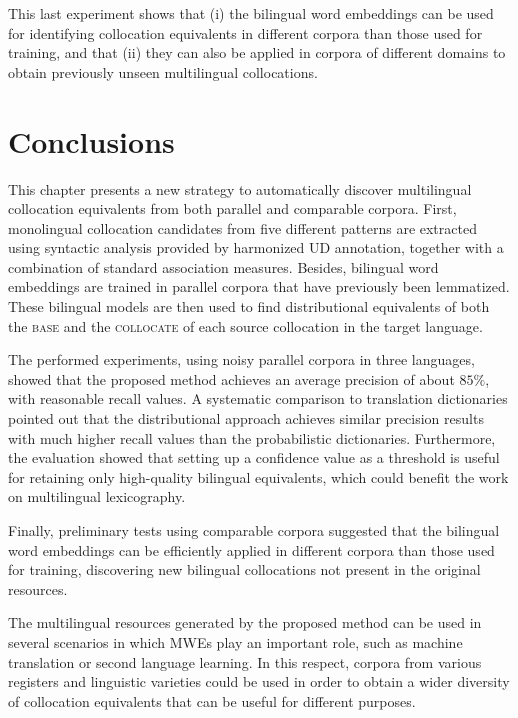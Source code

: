 \documentclass[output=paper
,modfonts
,nonflat]{langsci/langscibook}
\begin{document}
This last experiment shows that (i) the bilingual word embeddings can be used for identifying
collocation equivalents in different corpora than those used for training, and that
(ii) they can also be applied in corpora of different domains to obtain previously unseen
multilingual collocations.

%
\section{Conclusions}
\label{garcia:sec:conclusions}
This chapter presents a new strategy to automatically discover multilingual collocation
equivalents from both parallel and comparable corpora. First, monolingual collocation candidates from five different patterns are
extracted using syntactic analysis provided by harmonized UD annotation,
together with a combination of standard association measures. Besides, bilingual word embeddings are trained in parallel corpora
that have previously been lemmatized. These bilingual models are then
used to find distributional equivalents of both the \textsc{base} and
the \textsc{collocate} of each source collocation in the target language.

The performed experiments, using noisy parallel corpora in three languages,
showed that the proposed method achieves an average precision %
of about $85\%$, with reasonable recall values.
A systematic comparison to translation dictionaries pointed out that
the distributional approach achieves similar precision results with much
higher recall values than the probabilistic dictionaries.
Furthermore, the evaluation showed that setting up a confidence value as
a threshold is useful for retaining only high-quality bilingual
equivalents, which could benefit the work on multilingual lexicography.

Finally, preliminary tests using comparable corpora suggested that
the bilingual word embeddings can be efficiently applied in different
corpora than those used for training, discovering new bilingual collocations
not present in the original resources.

The multilingual resources generated by the proposed method can be used in several
scenarios in which MWEs play an important role, such as machine
translation or second language learning. In this respect, corpora from various registers
and linguistic varieties could be used in order to obtain a wider diversity of collocation
equivalents that can be useful for different purposes.
\end{document}
